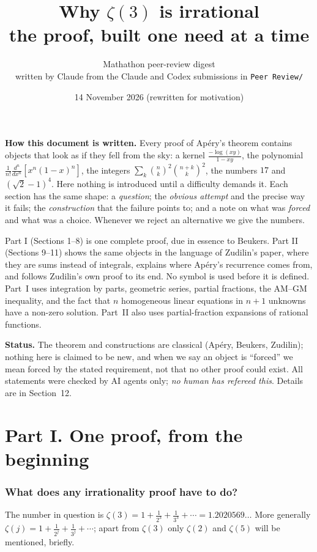 \documentclass[11pt]{article}
\title{Why $\zeta(3)$ is irrational\\[2mm]
\large the proof, built one need at a time}
\author{Mathathon peer-review digest\\
\small written by Claude from the Claude and Codex submissions in \texttt{Peer Review/}}
\date{14 November 2026 (rewritten for motivation)}
\theoremstyle{remark}
\begin{document}
\maketitle

\noindent\textbf{How this document is written.} Every proof of Ap\'ery's theorem contains
objects that look as if they fell from the sky: a kernel $\frac{-\log(xy)}{1-xy}$, the polynomial
$\frac1{n!}\frac{d^n}{dx^n}[x^n(1-x)^n]$, the integers $\sum_k\binom nk^2\binom{n+k}k^2$, the
numbers $17$ and $(\sqrt2-1)^4$. Here nothing is introduced until a difficulty demands it. Each
section has the same shape: a \emph{question}; the \emph{obvious attempt} and the precise way it
fails; the \emph{construction} that the failure points to; and a note on what was \emph{forced} and
what was a choice. Whenever we reject an alternative we give the numbers.

Part I (Sections 1--8) is one complete proof, due in essence to Beukers. Part II (Sections 9--11)
shows the same objects in the language of Zudilin's paper, where they are sums instead of
integrals, explains where Ap\'ery's recurrence comes from, and follows Zudilin's own proof to its
end. No symbol is used before it is
defined. Part~I uses integration by parts, geometric series, partial fractions, the AM--GM
inequality, and the fact that $n$ homogeneous linear equations in $n+1$ unknowns have a non-zero
solution. Part~II also uses partial-fraction expansions of rational functions.

\smallskip\noindent\textbf{Status.} The theorem and constructions are classical (Ap\'ery,
Beukers, Zudilin); nothing here is claimed to be new, and when we say an object is ``forced'' we
mean forced by the stated requirement, not that no other proof could exist. All statements were
checked by AI agents only; \emph{no human has refereed this}. Details are in Section~12.

\part*{Part I. One proof, from the beginning}

\section{What does any irrationality proof have to do?}

The number in question is $\zeta(3)=1+\frac1{2^3}+\frac1{3^3}+\cdots=1.2020569\ldots$ More
generally $\zeta(j)=1+\frac1{2^j}+\frac1{3^j}+\cdots$; apart from $\zeta(3)$ only $\zeta(2)$ and
$\zeta(5)$ will be mentioned, briefly.
\end{document}

